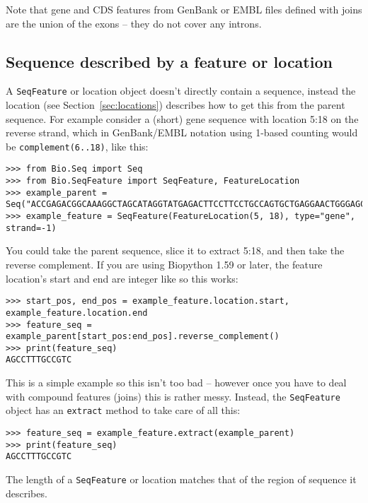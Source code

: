 Note that gene and CDS features from GenBank or EMBL files defined with joins
are the union of the exons -- they do not cover any introns.


\subsection{Sequence described by a feature or location}

A \verb|SeqFeature| or location object doesn't directly contain a sequence, instead the location (see Section~\ref{sec:locations}) describes how to get this from the parent sequence. For example consider a (short) gene sequence with location 5:18 on the reverse strand, which in GenBank/EMBL notation using 1-based counting would be \texttt{complement(6..18)}, like this:

\begin{verbatim}
>>> from Bio.Seq import Seq
>>> from Bio.SeqFeature import SeqFeature, FeatureLocation
>>> example_parent = Seq("ACCGAGACGGCAAAGGCTAGCATAGGTATGAGACTTCCTTCCTGCCAGTGCTGAGGAACTGGGAGCCTAC")
>>> example_feature = SeqFeature(FeatureLocation(5, 18), type="gene", strand=-1)
\end{verbatim}

You could take the parent sequence, slice it to extract 5:18, and then take the reverse complement.
If you are using Biopython 1.59 or later, the feature location's start and end are integer like so this works:

\begin{verbatim}
>>> start_pos, end_pos = example_feature.location.start, example_feature.location.end
>>> feature_seq = example_parent[start_pos:end_pos].reverse_complement()
>>> print(feature_seq)
AGCCTTTGCCGTC
\end{verbatim}

This is a simple example so this isn't too bad -- however once you have to deal with compound features (joins) this is rather messy. Instead, the \verb|SeqFeature| object has an \verb|extract| method to take care of all this:

\begin{verbatim}
>>> feature_seq = example_feature.extract(example_parent)
>>> print(feature_seq)
AGCCTTTGCCGTC
\end{verbatim}

The length of a \verb|SeqFeature| or location matches
that of the region of sequence it describes.

